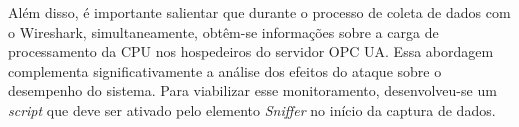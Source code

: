 
    Além disso, é importante salientar que durante o processo de coleta de dados com o Wireshark, simultaneamente, obtêm-se informações sobre a carga de processamento da CPU nos hospedeiros do servidor OPC UA. Essa abordagem complementa significativamente a análise dos efeitos do ataque sobre o desempenho do sistema. Para viabilizar esse monitoramento, desenvolveu-se um \textit{script} que deve ser ativado pelo elemento \textit{Sniffer} no início da captura de dados.

